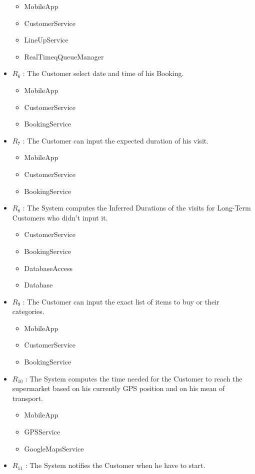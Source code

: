 \begin{itemize}
\begin{itemize}
	\item MobileApp
	\item CustomerService
	\item LineUpService
	\item RealTimeqQueueManager
	\end{itemize}
	\item $R_6$ : The Customer select date and time of his Booking.
	\begin{itemize}
	\item MobileApp
	\item CustomerService
	\item BookingService
	\end{itemize}
	\item $R_7$ : The Customer can input the expected duration of his visit.
	\begin{itemize}
	\item MobileApp
	\item CustomerService
	\item BookingService
	\end{itemize}
	\item $R_8$ : The System computes the Inferred Durations of the visits for Long-Term Customers who didn't input it.
	\begin{itemize}  
	\item CustomerService
	\item BookingService
	\item DatabaseAccess
	\item Database
	\end{itemize}
	\item $R_9$ : The Customer can input the exact list of items to buy or their categories. 
	 \begin{itemize}
	\item MobileApp
	\item CustomerService
	\item BookingService
	\end{itemize}
	\item $R_{10}$ : The System computes the time needed for the Customer to reach the supermarket based on his currently GPS position and on his mean of transport.
	\begin{itemize}
	\item MobileApp
	\item GPSService
	\item GoogleMapsService
	\end{itemize}
	\item $R_{11}$ : The System notifies the Customer when he have to start.

\end{itemize}

